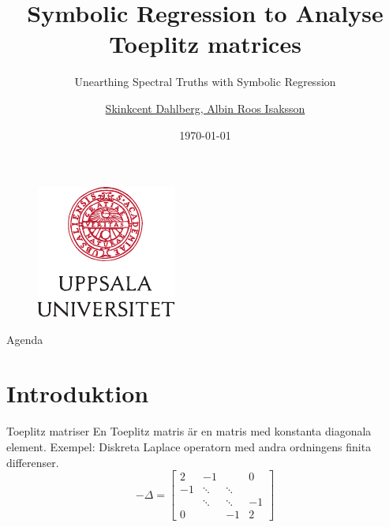 \documentclass{beamer}
\author[V. Dahlberg, A. Roos Isaksson, \contact]{\href{}{Skinkcent Dahlberg, Albin Roos Isaksson}}
\institute[IT Dep, UU]{\href{}{IT Department, Uppsala University}
    \\ \smallskip \contact}
\title[SR to Analyse Toeplitz]{Symbolic Regression to Analyse Toeplitz matrices}
\subtitle[\shortconference]{Unearthing Spectral Truths with Symbolic Regression}
\date[June 2025]{\small \today
    \\ \fullconference}
\begin{document}
{

\begin{frame}\label{start}
    \titlepage
    \begin{figure}
            \includegraphics[scale=0.65]{style/uu_logo.pdf} 
    \end{figure}
\end{frame}
}

\begin{frame}{Agenda}
    \tableofcontents[sectionstyle=show, subsectionstyle=show/shaded/hide, subsubsectionstyle=show/shaded/hide]
\end{frame}


\section{Introduktion}

\begin{frame}{Toeplitz matriser}
En Toeplitz matris är en matris med konstanta diagonala element. Exempel: Diskreta Laplace operatorn med andra ordningens finita differenser.
    \begin{equation}
        -\Delta = \begin{bmatrix}
        2 & -1 &  &  0\\
        -1 & \ddots & \ddots &  \\
         & \ddots & \ddots & -1 \\
         0& & -1 & 2
    \end{bmatrix}
    \end{equation}
\end{frame}
\end{document}
